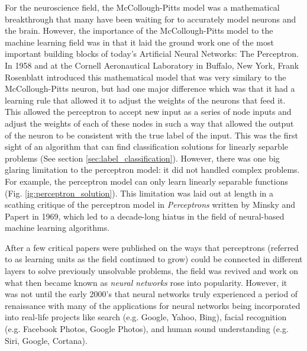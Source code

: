 For the neuroscience field, the McCollough-Pitts model was a mathematical breakthrough that many have been waiting for to accurately model neurons and the brain. However, the importance of the McCollough-Pitts model to the machine learning field was in that it laid the ground work one of the most important building blocks of today's Artificial Neural Networks: The Perceptron. In 1958 and at the Cornell Aeronautical Laboratory in Buffalo, New York, Frank Rosenblatt introduced this mathematical model that was very similary to the McCollough-Pitts neuron, but had one major difference which was that it had a learning rule that allowed it to adjust the weights of the neurons that feed it. This allowed the perceptron to accept new input as a series of node inputs and adjust the weights of each of these nodes in such a way that allowed the output of the neuron to be consistent with the true label of the input. This was the first sight of an algorithm that can find classification solutions for linearly separble problems (See section \ref{sec:label_classification}). However, there was one big glaring limitation to the perceptron model: it did not handled complex problems. For example, the perceptron model can only learn linearly separable functions (Fig. \ref{ig:perceptron_solution}). This limitation was laid out at length in a scathing critique of the perceptron model in \textit{Perceptrons} written by Minsky and Papert in 1969, which led to a decade-long hiatus in the field of neural-based machine learning algorithms. 

After a few critical papers were published on the ways that perceptrons (referred to as learning units as the field continued to grow) could be connected in different layers to solve previously unsolvable problems, the field was revived and work on what then became known as \textit{neural networks} rose into popularity. However, it was not until the early 2000's that neural networks truly experienced a period of renaissance with many of the applications for neural networks being incorporated into real-life projects like search (e.g. Google, Yahoo, Bing), facial recognition (e.g. Facebook Photos, Google Photos), and human sound understanding (e.g. Siri, Google, Cortana).


